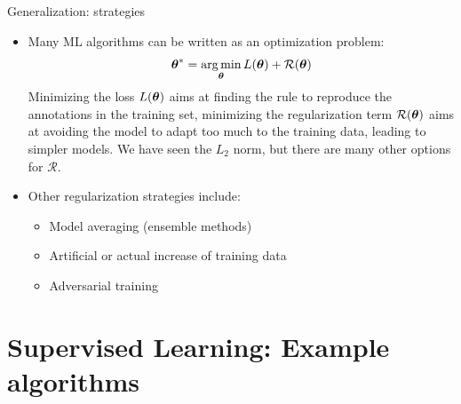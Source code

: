 \documentclass[xcolor=pdftex,dvipsnames,table]{beamer}
\begin{document}
\begin{frame}{Generalization: strategies}
\begin{itemize}
\item Many ML algorithms can be written as an optimization problem:
\begin{equation}
\boldsymbol{\theta} ^{\ast} = \operatorname*{arg\,min}_{\boldsymbol{\theta}} L (\boldsymbol{\theta}) + \mathcal{R}(\boldsymbol{\theta})
\end{equation}
Minimizing the loss $L (\boldsymbol{\theta})$ aims at finding the rule to reproduce the annotations in the training set, minimizing the regularization term $\mathcal{R}(\boldsymbol{\theta})$ aims at avoiding the model to adapt too much to the training data, leading to simpler models. We have seen the $L_2$ norm, but there are many other options for $\mathcal{R}$. 
\item Other regularization strategies include:
\begin{itemize}
\item Model averaging (ensemble methods)
\item Artificial or actual increase of training data
\item Adversarial training
\end{itemize}
\end{itemize}
\end{frame}

\section{Supervised Learning: Example algorithms}


\end{document}
